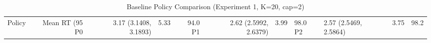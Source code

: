 \begin{table}[htbp]
\centering
\caption{Baseline Policy Comparison (Experiment 1, K=20, cap=2)}
\label{tab:baseline}
\begin{tabular}{lrrrrrr}
\toprule
Policy & Mean RT (95%
\midrule
P0 & 3.17 (3.1408, 3.1893) & 5.33 & 94.0%
P1 & 2.62 (2.5992, 2.6379) & 3.99 & 98.0%
P2 & 2.57 (2.5469, 2.5864) & 3.75 & 98.2%
\bottomrule
\end{tabular}
\end{table}